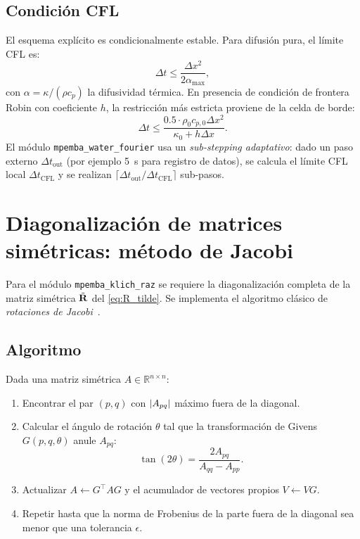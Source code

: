\subsection{Condición CFL}

El esquema explícito es condicionalmente estable. Para difusión pura, el límite 
CFL es:
\begin{equation}
    \Delta t \leq \frac{\Delta x^2}{2 \alpha_{\max}},
\end{equation}
%
con $\alpha = \kappa/(\rho c_p)$ la difusividad térmica. En presencia de 
condición de frontera Robin con coeficiente $h$, la restricción más estricta 
proviene de la celda de borde:
\begin{equation}
    \Delta t \leq \frac{0.5 \cdot \rho_0 c_{p,0} \Delta x^2}{\kappa_0 + h \Delta x}.
    \label{eq:cfl_robin}
\end{equation}
%
\noindent El módulo \texttt{mpemba\_water\_fourier} usa un \emph{sub-stepping 
adaptativo}: dado un paso externo $\Delta t_{\mathrm{out}}$ (por ejemplo \SI{5}{\second} 
para registro de datos), se calcula el límite CFL local $\Delta t_{\mathrm{CFL}}$ 
y se realizan $\lceil \Delta t_{\mathrm{out}} / \Delta t_{\mathrm{CFL}} \rceil$ 
sub-pasos.

\section{Diagonalización de matrices simétricas: método de Jacobi}

Para el módulo \texttt{mpemba\_klich\_raz} se requiere la diagonalización 
completa de la matriz simétrica $\tilde{\vb{R}}$ del \cref{eq:R_tilde}. Se 
implementa el algoritmo clásico de \emph{rotaciones de Jacobi}~\cite{golub2013}.

\subsection{Algoritmo}

Dada una matriz simétrica $A \in \mathbb{R}^{n \times n}$:
\begin{enumerate}
\item Encontrar el par $(p, q)$ con $\abs{A_{pq}}$ máximo fuera de la diagonal.
\item Calcular el ángulo de rotación $\theta$ tal que la transformación de 
Givens $G(p, q, \theta)$ anule $A_{pq}$:
\begin{equation}
    \tan(2\theta) = \frac{2 A_{pq}}{A_{qq} - A_{pp}}.
\end{equation}
\item Actualizar $A \leftarrow G^{\top} A G$ y el acumulador de vectores 
propios $V \leftarrow V G$.
\item Repetir hasta que la norma de Frobenius de la parte fuera de la diagonal 
sea menor que una tolerancia $\epsilon$.
\end{enumerate}

